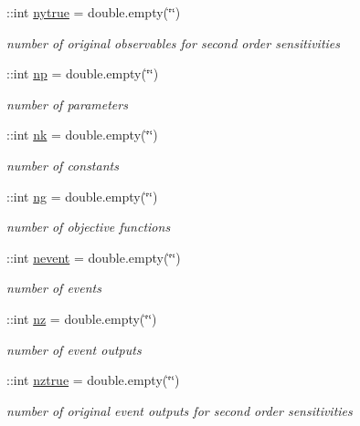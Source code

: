 \begin{DoxyCompactItemize}
\+::int \mbox{\hyperlink{classamimodel_ac91d7b36031ec122abc9f739692b02e8}{nytrue}} = double.\+empty(\char`\"{}\char`\"{})
\begin{DoxyCompactList}\small\item\em number of original observables for second order sensitivities \end{DoxyCompactList}\item 
\+::int \mbox{\hyperlink{classamimodel_a6f6e2fe71b05c4c2f2d967ce9ca02dfd}{np}} = double.\+empty(\char`\"{}\char`\"{})
\begin{DoxyCompactList}\small\item\em number of parameters \end{DoxyCompactList}\item 
\+::int \mbox{\hyperlink{classamimodel_afd6bea572754e0c3c320664bdccf0200}{nk}} = double.\+empty(\char`\"{}\char`\"{})
\begin{DoxyCompactList}\small\item\em number of constants \end{DoxyCompactList}\item 
\+::int \mbox{\hyperlink{classamimodel_a436ae5c63852a2df5372ebffaa35161c}{ng}} = double.\+empty(\char`\"{}\char`\"{})
\begin{DoxyCompactList}\small\item\em number of objective functions \end{DoxyCompactList}\item 
\+::int \mbox{\hyperlink{classamimodel_aab5c7f06273122b68624eb3bca6a9b6e}{nevent}} = double.\+empty(\char`\"{}\char`\"{})
\begin{DoxyCompactList}\small\item\em number of events \end{DoxyCompactList}\item 
\+::int \mbox{\hyperlink{classamimodel_a79f11413e5bfe18a0e71e17574399ad5}{nz}} = double.\+empty(\char`\"{}\char`\"{})
\begin{DoxyCompactList}\small\item\em number of event outputs \end{DoxyCompactList}\item 
\+::int \mbox{\hyperlink{classamimodel_a364ecd990baeeefd1de3e6795cd50a58}{nztrue}} = double.\+empty(\char`\"{}\char`\"{})
\begin{DoxyCompactList}\small\item\em number of original event outputs for second order sensitivities \end{DoxyCompactList}\item 

\end{DoxyCompactItemize}
